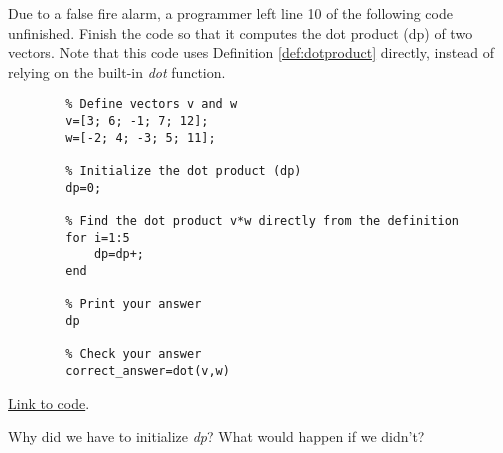 \documentclass{ximera}
\begin{document}
\begin{problem}\label{prob_oct_vec_loop}
    Due to a false fire alarm, a programmer left line 10 of the following code unfinished.  Finish the code so that it computes the dot product (dp) of two vectors.  Note that this code uses Definition \ref{def:dotproduct} directly, instead of relying on the built-in \emph{dot} function.

    \begin{verbatim}
        % Define vectors v and w
        v=[3; 6; -1; 7; 12];
        w=[-2; 4; -3; 5; 11];

        % Initialize the dot product (dp)
        dp=0;

        % Find the dot product v*w directly from the definition
        for i=1:5
            dp=dp+;
        end

        % Print your answer
        dp

        % Check your answer
        correct_answer=dot(v,w)
    \end{verbatim}

    \href{https://sagecell.sagemath.org/?z=eJxdjssKwjAQRfeB_MPdFHwVjPUBSlaK4M59EZEmxWBNyhgT9OtNqRud3cy9nDkZdro2ViPoyjt6IOBiFSJnQZYFlsgFVhCz04azKMt8hjnyAgsI0Z04y3CwxptLY94a_qqhnEdLTj0rj4Fqh5ypVk6_3b1J8P9WGEUoQ0mgeaEmd-8bnVciO8tZ7QhGivWCM6RJQNWOE1Jb1XOPZKzHyz0p6T-ipu5rH22vurr9RpWj7tu532VyGYRJHH4ATLJPyQ==&lang=octave&interacts=eJyLjgUAARUAuQ==}{Link to code}.

    Why did we have to initialize \emph{dp}?  What would happen if we didn't?
\end{problem}
 
\end{document}
